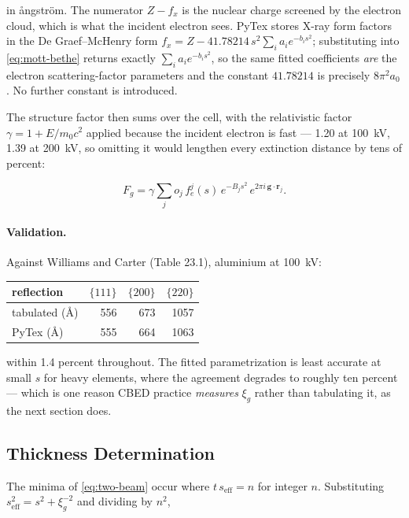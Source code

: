 in \aa ngstr\"om. The numerator \(Z - f_{x}\) is the nuclear charge screened by the electron
cloud, which is what the incident electron sees. PyTex stores X-ray form factors in the
De Graef--McHenry form \(f_{x} = Z - 41.78214\,s^{2}\sum_i a_i e^{-b_i s^{2}}\); substituting
into \eqref{eq:mott-bethe} returns exactly \(\sum_i a_i e^{-b_i s^{2}}\), so the same fitted
coefficients \emph{are} the electron scattering-factor parameters and the constant
\(41.78214\) is precisely \(8\pi^{2}a_{0}\). No further constant is introduced.

The structure factor then sums over the cell, with the relativistic factor
\(\gamma = 1 + E/m_{0}c^{2}\) applied because the incident electron is fast --- 1.20 at
100~kV, 1.39 at 200~kV, so omitting it would lengthen every extinction distance by tens of
percent:

\begin{equation}
  F_{g} = \gamma \sum_{j} o_{j}\,f_{e}^{j}(s)\,e^{-B_{j}s^{2}}\,
          e^{2\pi i\,\mathbf{g}\cdot\mathbf{r}_{j}} .
\end{equation}

\paragraph{Validation.} Against Williams and Carter (Table 23.1), aluminium at 100~kV:

\begin{center}
\begin{tabular}{lrrr}
\hline
reflection & \(\{111\}\) & \(\{200\}\) & \(\{220\}\) \\
\hline
tabulated (\AA) & 556 & 673 & 1057 \\
PyTex (\AA)     & 555 & 664 & 1063 \\
\hline
\end{tabular}
\end{center}

within 1.4 percent throughout. The fitted parametrization is least accurate at small \(s\)
for heavy elements, where the agreement degrades to roughly ten percent --- which is one
reason CBED practice \emph{measures} \(\xi_{g}\) rather than tabulating it, as the next
section does.

\subsection{Thickness Determination}

The minima of \eqref{eq:two-beam} occur where \(t\,s_{\mathrm{eff}} = n\) for integer
\(n\). Substituting \(s_{\mathrm{eff}}^{2} = s^{2} + \xi_{g}^{-2}\) and dividing by
\(n^{2}\),

